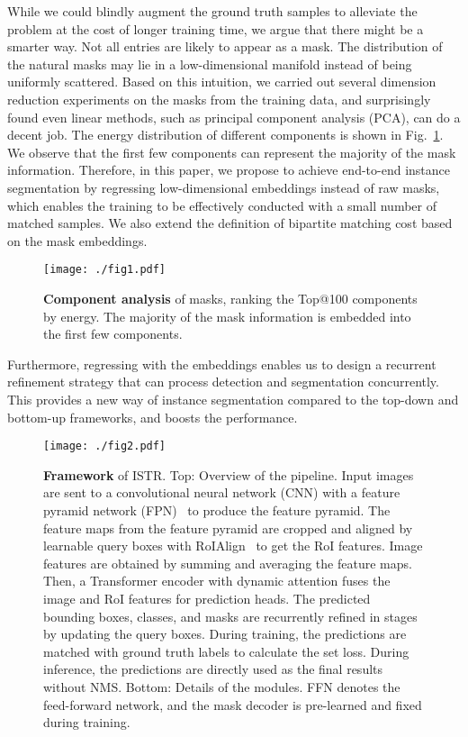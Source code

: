 \documentclass[10pt,twocolumn,letterpaper]{article}
\begin{document}
While we could blindly augment the ground truth samples to alleviate the problem at the cost of longer training time, we argue that there might be a smarter way.
Not all  entries are likely to appear as a mask.
The distribution of the natural masks may lie in a low-dimensional manifold instead of being uniformly scattered.
Based on this intuition, we carried out several dimension reduction experiments on the masks from the training data, and surprisingly found even linear methods, such as principal component analysis (PCA), can do a decent job.
The energy distribution of different components is shown in Fig.~\ref{fig1}.
We observe that the first few components can represent the majority of the mask information.
Therefore, in this paper, we propose to achieve end-to-end instance segmentation by regressing low-dimensional embeddings instead of raw masks, which enables the training to be effectively conducted with a small number of matched samples.
We also extend the definition of bipartite matching cost based on the mask embeddings.
\begin{figure}[t]
\centering
\texttt{[image: ./fig1.pdf]}\vspace{-2.mm}
\caption{
\textbf{Component analysis} of masks, ranking the Top@100 components by energy.
The majority of the mask information is embedded into the first few components.
}\vspace{-0.5mm}
\label{fig1}
\end{figure}
Furthermore, regressing with the embeddings enables us to design a recurrent refinement strategy that can process detection and segmentation concurrently.
This provides a new way of instance segmentation compared to the top-down and bottom-up frameworks, and boosts the performance.
\begin{figure*}[!ht]
\centering
\texttt{[image: ./fig2.pdf]}\vspace{-2.mm}
\caption{
\textbf{Framework} of ISTR.
Top: Overview of the pipeline.
Input images are sent to a convolutional neural network (CNN) with a feature pyramid network (FPN)~\cite{lin2017feature} to produce the feature pyramid.
The feature maps from the feature pyramid are cropped and aligned by learnable query boxes with RoIAlign~\cite{he2017mask} to get the RoI features.
Image features are obtained by summing and averaging the feature maps.
Then, a Transformer encoder with dynamic attention fuses the image and RoI features for prediction heads.
The predicted bounding boxes, classes, and masks are recurrently refined in  stages by updating the query boxes.
During training, the predictions are matched with ground truth labels to calculate the set loss.
During inference, the predictions are directly used as the final results without NMS.
Bottom: Details of the modules.
FFN denotes the feed-forward network, and the mask decoder is pre-learned and fixed during training.
}\vspace{-0.5mm}
\label{fig2}
\end{figure*}
\end{document}
